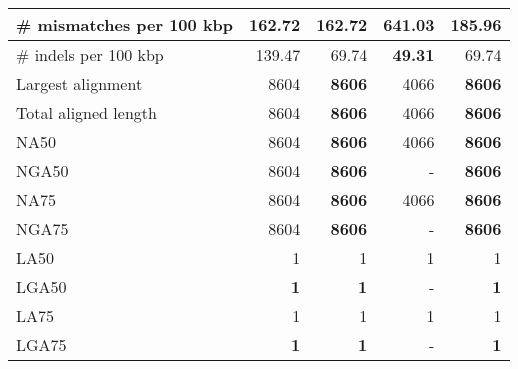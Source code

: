 \documentclass[12pt,a4paper]{article}
\begin{document}
\begin{table}[ht]
\begin{center}
\begin{tabular}{|l*{4}{|r}|}
\# mismatches per 100 kbp & {\bf 162.72} & {\bf 162.72} & 641.03 & 185.96 \\ \hline
\# indels per 100 kbp & 139.47 & 69.74 & {\bf 49.31} & 69.74 \\ \hline
Largest alignment & 8604 & {\bf 8606} & 4066 & {\bf 8606} \\ \hline
Total aligned length & 8604 & {\bf 8606} & 4066 & {\bf 8606} \\ \hline
NA50 & 8604 & {\bf 8606} & 4066 & {\bf 8606} \\ \hline
NGA50 & 8604 & {\bf 8606} & - & {\bf 8606} \\ \hline
NA75 & 8604 & {\bf 8606} & 4066 & {\bf 8606} \\ \hline
NGA75 & 8604 & {\bf 8606} & - & {\bf 8606} \\ \hline
LA50 & 1 & 1 & 1 & 1 \\ \hline
LGA50 & {\bf 1} & {\bf 1} & - & {\bf 1} \\ \hline
LA75 & 1 & 1 & 1 & 1 \\ \hline
LGA75 & {\bf 1} & {\bf 1} & - & {\bf 1} \\ \hline
\end{tabular}
\end{center}
\end{table}
\end{document}
